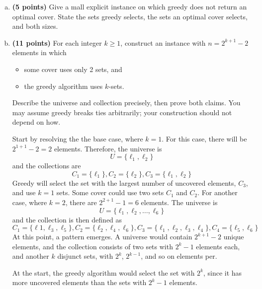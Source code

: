 \documentclass[10pt,letterpaper]{article}
\begin{document}
\begin{enumerate}[(a)]

\item \textbf{(5 points)} Give a mall explicit instance on which greedy does not return an optimal cover. State the sets greedy selects, the sets an optimal cover selects, and both sizes.

\color{TangGreen}

\color{black}

\item \textbf{(11 points)} For each integer $k \geq 1$, construct an instance with $n = 2^{k + 1} - 2$ elements in which 

\begin{itemize}

\item some cover uses only 2 sets, and

\item the greedy algorithm uses $k$-sets.

\end{itemize}

Describe the universe and collection precisely, then prove both claims. You may assume greedy breaks ties arbitrarily; your construction should not depend on how. 

\color{TangGreen}
Start by resolving the the base case, where $k = 1$. For this case, there will be $2^{1 + 1} - 2 = 2$ elements. Therefore, the universe is
$$U = \{ \ell_{1}, \ell_{2} \}$$
and the collections are 
$$C_{1} = \{ \ell_{1} \}, C_{2} = \{ \ell_{2} \}, C_{3} = \{ \ell_{1}, \ell_{2} \}$$
Greedy will select the set with the largest number of uncovered elements, $C_{3}$, and use $k = 1$ sets. Some cover could use two sets $C_{1}$ and $C_{2}$. For another case, where $k = 2$, there are $2^{2 + 1} - 1 = 6$ elements. The universe is 
$$U = \{ \ell_{1}, \ell_{2}, \dots, \ell_{6} \}$$
and the collection is then defined as 
$$C_{1} = \{ \ell{1}, \ell_{3}, \ell_{5} \}, C_{2} = \{ \ell_{2}, \ell_{4}, \ell_{6} \}, C_{3} = \{ \ell_{1}, \ell_{2}, \ell_{3}, \ell_{4} \}, C_{4} = \{ \ell_{5}, \ell_{6} \}$$
At this point, a pattern emerges. A universe would contain $2^{k + 1} - 2$ unique elements, and the collection consists of two sets with $2^{k} - 1$ elements each, and another $k$ disjunct sets, with $2^{k}$, $2^{k - 1}$, and so on elements per.

At the start, the greedy algorithm would select the set with $2^{k}$, since it has more uncovered elements than the sets with $2^{k} - 1$ elements. 
\color{black}

\end{enumerate}
\end{document}
